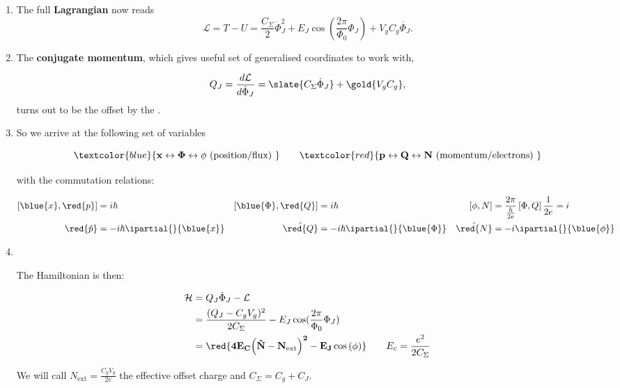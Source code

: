 \begin{enumerate}
\item The full \textbf{Lagrangian} now reads
  \begin{equation}
    \mathcal{L} = T - U = \frac{C_\Sigma}{2}\dot{\Phi}_J^2 + E_J\cos\left( \frac{2\pi}{\Phi_0}\Phi_J \right) + V_gC_g\dot{\Phi_J}.
  \end{equation}

\item The \textbf{conjugate momentum}, which gives useful set of generalised coordinates to work with,

  \begin{equation}
    Q_J = \frac{d\mathcal{L}}{d\dot{\Phi}_J} = \slate{C_\Sigma\dot{\Phi}_J} + \gold{V_gC_g},
  \end{equation}
  \noindent turns out  to be the   offset by the
  .

\item So we arrive at the following set of variables

  \begin{equation}
    { \textcolor{blue}{\mathbf{x\leftrightarrow \Phi \leftrightarrow \phi} \text{ (position/flux) }}\qquad \textcolor{red}{\mathbf{p\leftrightarrow Q \leftrightarrow N \text{ (momentum/electrons) }}}}
  \end{equation}

  \noindent with the commutation relations:

  \begin{align}
    \left[\blue{x},\red{p}\right] & =i\hbar & \left[\blue{\Phi},\red{Q}\right] & = i\hbar & \left[\phi,N\right] & = \frac{2\pi}{\frac{h}{2e}}\left[\Phi,Q\right]\frac{1}{2e} = i\\
    \red{\hat{p}} & = -i\hbar\ipartial{}{\blue{x}} & \hat{\red{Q}} & =-i\hbar\ipartial{}{\blue{\Phi}} & \hat{\red{N}} & =-i\ipartial{}{\blue{\phi}}
  \end{align}

\item\

\begin{framed}\noindent
  The Hamiltonian is then:

  \begin{equation}\label{eqn:cpbox_final}
    \begin{aligned}
      \mathcal{H} & = Q_J\dot{\Phi}_J - \mathcal{L}\\
      & = \frac{(Q_J - C_gV_g)^2}{2C_\Sigma} - E_J\cos(\frac{2\pi}{\Phi_0}\Phi_J)\\
      &    =    \mathbf{\red{4E_C{\left(\hat{N}-N_\text{ext}\right)^2}-     E_J\cos\left(\phi\right)}}\qquad    E_c    =
      \frac{e^2}{2C_\Sigma}
    \end{aligned}
  \end{equation}

  \noindent We will call $ N_\text{ext} = \frac{C_g V_g}{2e} $ the effective offset charge and $C_{\Sigma} = C_g+C_J$.
\end{framed}
\end{enumerate}


